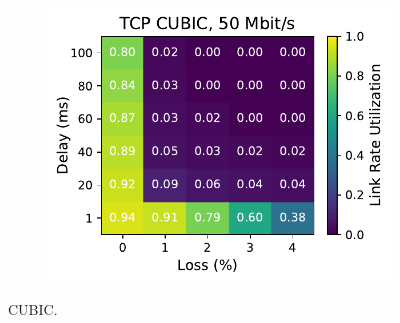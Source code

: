 \begin{figure}[ht]
\begin{subfigure}[b]{1cm}
        \includegraphics[width=\linewidth,trim={8cm 0 0 0},clip]{figures/heatmaps/heatmap_tcp_cubic_50mbps.pdf}
        \vspace*{0.01cm}
    \end{subfigure}
    \caption{CUBIC.}
\end{figure}

